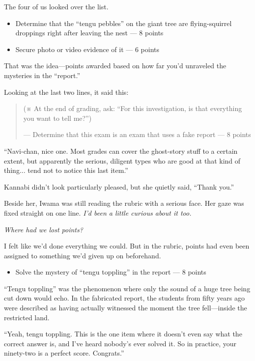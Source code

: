 \documentclass[
    a4paper,
    12pt,
    twoside,
    openany,
    UTF8,
    fontset=windows
]{ctexbook}
\begin{document}
The four of us looked over the list.

{\bfseries
\begin{itemize}
\item Determine that the ``tengu pebbles'' on the giant tree are flying-squirrel droppings right after leaving the nest --- 8 points
\item Secure photo or video evidence of it --- 6 points
\end{itemize}
}

That was the idea---points awarded based on how far you'd unraveled the mysteries in the ``report.''

Looking at the last two lines, it said this:

{\bfseries
\begin{quote}
(※ At the end of grading, ask: ``For this investigation, is that everything you want to tell me?'')

--- Determine that this exam is an exam that uses a fake report --- 8 points
\end{quote}
}

``Navi-chan, nice one. Most grades can cover the ghost-story stuff to a certain extent, but apparently the serious, diligent types who are good at that kind of thing... tend not to notice this last item.''

Kannabi didn't look particularly pleased, but she quietly said, ``Thank you.''

Beside her, Iwama was still reading the rubric with a serious face. Her gaze was fixed straight on one line. \textit{I'd been a little curious about it too.}

\textit{Where had we lost points?}

I felt like we'd done everything we could. But in the rubric, points had even been assigned to something we'd given up on beforehand.

{\bfseries
\begin{itemize}
\item Solve the mystery of ``tengu toppling'' in the report --- 8 points
\end{itemize}
}

``Tengu toppling'' was the phenomenon where only the sound of a huge tree being cut down would echo. In the fabricated report, the students from fifty years ago were described as having actually witnessed the moment the tree fell---inside the restricted land.

``Yeah, tengu toppling. This is the one item where it doesn't even say what the correct answer is, and I've heard nobody's ever solved it. So in practice, your ninety-two is a perfect score. Congrats.''
\end{document}
